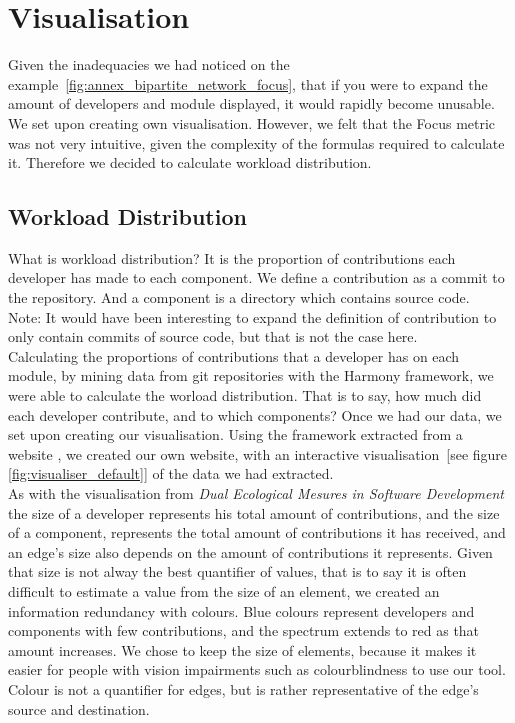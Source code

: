 \section{Visualisation}

Given the inadequacies we had noticed on the example~\ref{fig:annex_bipartite_network_focus}, that if you were to expand the amount of developers and module displayed, it would rapidly become unusable. We set upon creating own visualisation.
However, we felt that the Focus metric was not very intuitive, given the complexity of the formulas required to calculate it. Therefore we decided to calculate workload distribution.

\subsection{Workload Distribution}

What is workload distribution?
It is the proportion of contributions each developer has made to each component.
We define a contribution as a commit to the repository.
And a component is a directory which contains source code.\\
Note: It would have been interesting to expand the definition of contribution to only contain commits of source code, but that is not the case here.\\

Calculating the proportions of contributions that a developer has on each module, by mining data from git repositories with the Harmony\cite{Harmony} framework, we were able to calculate the worload distribution. That is to say, how much did each developer contribute, and to which components?
Once we had our data, we set upon creating our visualisation. Using the framework extracted from a website \cite{peoplemov}, we created our own website, with an interactive visualisation~[see figure \ref{fig:visualiser_default}] of the data we had extracted.\\[0.3cm]
As with the visualisation from \emph{Dual Ecological Mesures in Software Development}\cite{Posnett} the size of a developer represents his total amount of contributions, and the size of a component, represents the total amount of contributions it has received, and an edge's size also depends on the amount of contributions it represents.
Given that size is not alway the best quantifier of values, that is to say it is often difficult to estimate a value from the size of an element, we created an information redundancy with colours. Blue colours represent developers and components with few contributions, and the spectrum extends to red as that amount increases.
We chose to keep the size of elements, because it makes it easier for people with vision impairments such as colourblindness to use our tool.
Colour is not a quantifier for edges, but is rather representative of the edge's source and destination.\\

